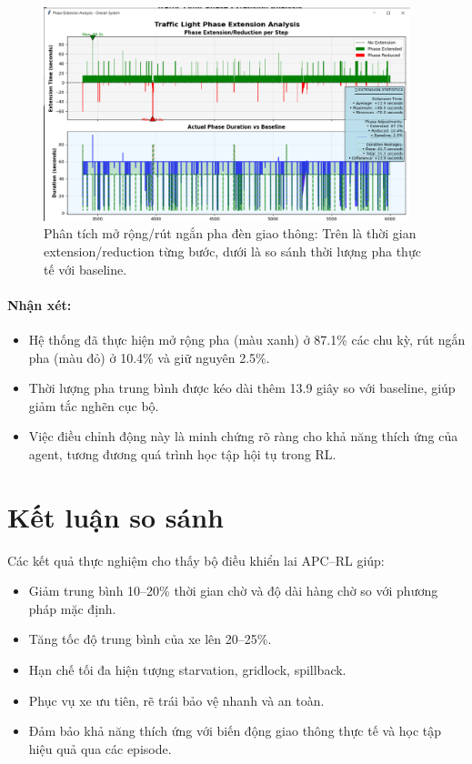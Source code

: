 \begin{figure}[H]
    \centering
    \includegraphics[width=0.95\textwidth]{image.png}
    \caption{Phân tích mở rộng/rút ngắn pha đèn giao thông: Trên là thời gian extension/reduction từng bước, dưới là so sánh thời lượng pha thực tế với baseline.}
    \label{fig:phase_extension_analysis}
\end{figure}

\paragraph{Nhận xét:}
\begin{itemize}
    \item Hệ thống đã thực hiện mở rộng pha (màu xanh) ở 87.1\% các chu kỳ, rút ngắn pha (màu đỏ) ở 10.4\% và giữ nguyên 2.5\%.
    \item Thời lượng pha trung bình được kéo dài thêm 13.9 giây so với baseline, giúp giảm tắc nghẽn cục bộ.
    \item Việc điều chỉnh động này là minh chứng rõ ràng cho khả năng thích ứng của agent, tương đương quá trình học tập hội tụ trong RL.
\end{itemize}

\section{Kết luận so sánh}

Các kết quả thực nghiệm cho thấy bộ điều khiển lai APC–RL giúp:
\begin{itemize}
    \item Giảm trung bình 10–20\% thời gian chờ và độ dài hàng chờ so với phương pháp mặc định.
    \item Tăng tốc độ trung bình của xe lên 20–25\%.
    \item Hạn chế tối đa hiện tượng starvation, gridlock, spillback.
    \item Phục vụ xe ưu tiên, rẽ trái bảo vệ nhanh và an toàn.
    \item Đảm bảo khả năng thích ứng với biến động giao thông thực tế và học tập hiệu quả qua các episode.
\end{itemize}
